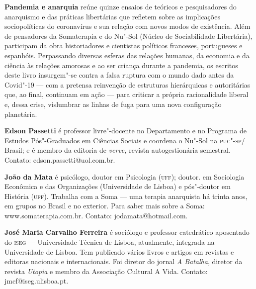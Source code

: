 
\textbf{Pandemia e anarquia} reúne quinze ensaios de teóricos e pesquisadores do anarquismo e das práticas libertárias que refletem sobre as implicações sociopolíticas do coronavírus e sua relação com novos modos de existência. Além de pensadores da Somaterapia e do Nu"-Sol (Núcleo de Sociabilidade Libertária), participam da obra historiadores e cientistas políticos franceses, portugueses e espanhóis. Perpassando diversas esferas das relações humanas, da economia e da ciência às relações amorosas e ao ser criança durante a pandemia, os escritos deste livro insurgem"-se contra a falsa ruptura com o mundo dado antes da Covid"-19 --- com a pretensa reinvenção de estruturas hierárquicas e autoritárias que, ao final, continuam em ação --- para criticar a própria racionalidade liberal e, dessa crise, vislumbrar as
linhas de fuga para uma nova configuração planetária.


\textbf{Edson Passetti} é professor livre"-docente no Departamento e no
Programa de Estudos Pós"-Graduados em Ciências Sociais e coordena o
Nu"-Sol na \textsc{puc"-sp}/ Brasil; e é membro da editoria de \emph{verve,} revista autogestionária semestral. Contato: edson.passetti@uol.com.br.

\textbf{João da Mata} é psicólogo, doutor em Psicologia (\textsc{uff}); doutor.
em Sociologia Econômica e das Organizações (Universidade de Lisboa) e
pós"-doutor em História (\textsc{uff}). Trabalha com a Soma --- uma terapia
anarquista há trinta anos, em grupos no Brasil e no exterior. Para saber
mais sobre a Soma:
www.somaterapia.com.br. Contato:
jodamata@hotmail.com.

\textbf{José Maria Carvalho Ferreira} é sociólogo e professor
catedrático aposentado do \textsc{iseg} --- Universidade Técnica de Lisboa,
atualmente, integrada na Universidade de Lisboa. Tem publicado vários
livros e artigos em revistas e editoras nacionais e internacionais. Foi
diretor do jornal \emph{A Batalha}, diretor da revista \emph{Utopia} e
membro da Associação Cultural A Vida. Contato:
jmcf@iseg.ulisboa.pt.


